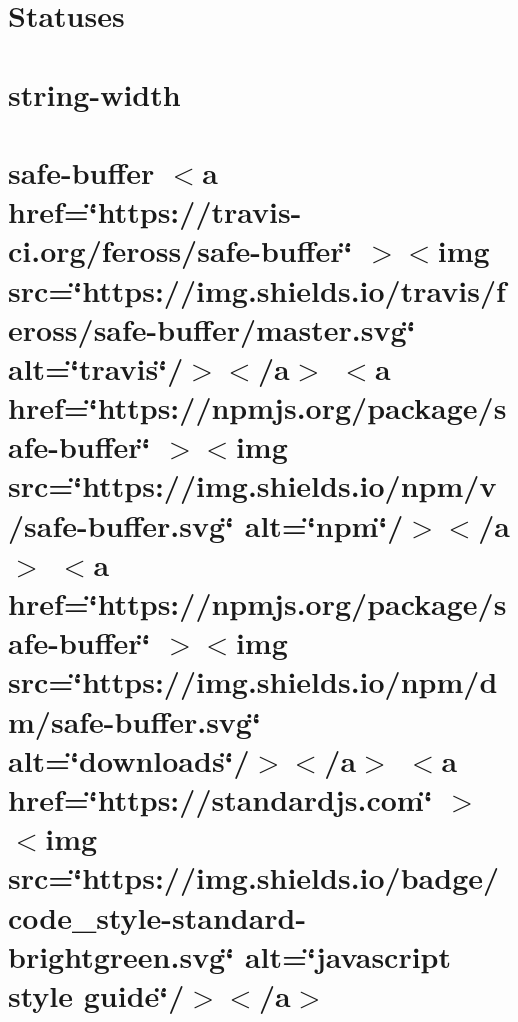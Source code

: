 \documentclass[twoside]{book}
\newcommand{\+}{\discretionary{\mbox{\scriptsize$\hookleftarrow$}}{}{}}
\begin{document}
\chapter{Statuses}
\label{md__c___users_vaishnavi_jadhav__desktop__developer_code_mean_stack_example_client_node_modules_statuses__r_e_a_d_m_e}

\chapter{string-\/width}
\label{md__c___users_vaishnavi_jadhav__desktop__developer_code_mean_stack_example_client_node_modules_string_width_readme}

\chapter{safe-\/buffer \texorpdfstring{$<$}{<}a href=\char`\"{}https\+://travis-\/ci.\+org/feross/safe-\/buffer\char`\"{} \texorpdfstring{$>$}{>}\texorpdfstring{$<$}{<}img src=\char`\"{}https\+://img.\+shields.\+io/travis/feross/safe-\/buffer/master.\+svg\char`\"{} alt=\char`\"{}travis\char`\"{}/\texorpdfstring{$>$}{>}\texorpdfstring{$<$}{<}/a\texorpdfstring{$>$}{>} \texorpdfstring{$<$}{<}a href=\char`\"{}https\+://npmjs.\+org/package/safe-\/buffer\char`\"{} \texorpdfstring{$>$}{>}\texorpdfstring{$<$}{<}img src=\char`\"{}https\+://img.\+shields.\+io/npm/v/safe-\/buffer.\+svg\char`\"{} alt=\char`\"{}npm\char`\"{}/\texorpdfstring{$>$}{>}\texorpdfstring{$<$}{<}/a\texorpdfstring{$>$}{>} \texorpdfstring{$<$}{<}a href=\char`\"{}https\+://npmjs.\+org/package/safe-\/buffer\char`\"{} \texorpdfstring{$>$}{>}\texorpdfstring{$<$}{<}img src=\char`\"{}https\+://img.\+shields.\+io/npm/dm/safe-\/buffer.\+svg\char`\"{} alt=\char`\"{}downloads\char`\"{}/\texorpdfstring{$>$}{>}\texorpdfstring{$<$}{<}/a\texorpdfstring{$>$}{>} \texorpdfstring{$<$}{<}a href=\char`\"{}https\+://standardjs.\+com\char`\"{} \texorpdfstring{$>$}{>}\texorpdfstring{$<$}{<}img src=\char`\"{}https\+://img.\+shields.\+io/badge/code\+\_\+style-\/standard-\/brightgreen.\+svg\char`\"{} alt=\char`\"{}javascript style guide\char`\"{}/\texorpdfstring{$>$}{>}\texorpdfstring{$<$}{<}/a\texorpdfstring{$>$}{>}}
\label{md__c___users_vaishnavi_jadhav__desktop__developer_code_mean_stack_example_client_node_modules_sb426c66b818eff4f37209ac451231bdb}

\end{document}
